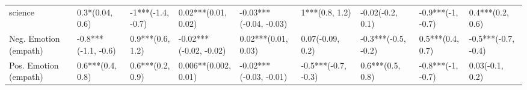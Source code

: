 \begin{tabular}{lllllllll}
science               &      0.3*(0.04, 0.6) &  -1***(-1.4, -0.7) &      0.02***(0.01, 0.02) &  -0.03***(-0.04, -0.03) &       1***(0.8, 1.2) &     -0.02(-0.2, 0.1) &     -0.9***(-1, -0.7) &     0.4***(0.2, 0.6) \\
Neg. Emotion (empath) &  -0.8***(-1.1, -0.6) &   0.9***(0.6, 1.2) &   -0.02***(-0.02, -0.02) &     0.02***(0.01, 0.03) &     0.07(-0.09, 0.2) &  -0.3***(-0.5, -0.2) &      0.5***(0.4, 0.7) &  -0.5***(-0.7, -0.4) \\
Pos. Emotion (empath) &     0.6***(0.4, 0.8) &   0.6***(0.2, 0.9) &     0.006**(0.002, 0.01) &  -0.02***(-0.03, -0.01) &  -0.5***(-0.7, -0.3) &     0.6***(0.5, 0.8) &     -0.8***(-1, -0.7) &      0.03(-0.1, 0.2) \\
\bottomrule
\end{tabular}
